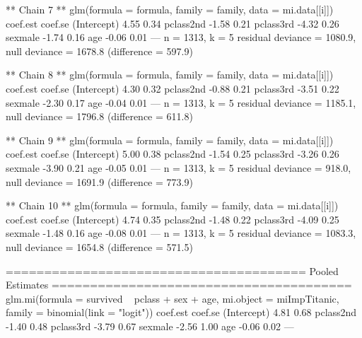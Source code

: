 \begin{Schunk}
\begin{Soutput}
** Chain 7 **
glm(formula = formula, family = family, data = mi.data[[i]])
            coef.est coef.se
(Intercept)  4.55     0.34  
pclass2nd   -1.58     0.21  
pclass3rd   -4.32     0.26  
sexmale     -1.74     0.16  
age         -0.06     0.01  
---
  n = 1313, k = 5
  residual deviance = 1080.9, null deviance = 1678.8 (difference = 597.9)

** Chain 8 **
glm(formula = formula, family = family, data = mi.data[[i]])
            coef.est coef.se
(Intercept)  4.30     0.32  
pclass2nd   -0.88     0.21  
pclass3rd   -3.51     0.22  
sexmale     -2.30     0.17  
age         -0.04     0.01  
---
  n = 1313, k = 5
  residual deviance = 1185.1, null deviance = 1796.8 (difference = 611.8)

** Chain 9 **
glm(formula = formula, family = family, data = mi.data[[i]])
            coef.est coef.se
(Intercept)  5.00     0.38  
pclass2nd   -1.54     0.25  
pclass3rd   -3.26     0.26  
sexmale     -3.90     0.21  
age         -0.05     0.01  
---
  n = 1313, k = 5
  residual deviance = 918.0, null deviance = 1691.9 (difference = 773.9)

** Chain 10 **
glm(formula = formula, family = family, data = mi.data[[i]])
            coef.est coef.se
(Intercept)  4.74     0.35  
pclass2nd   -1.48     0.22  
pclass3rd   -4.09     0.25  
sexmale     -1.48     0.16  
age         -0.08     0.01  
---
  n = 1313, k = 5
  residual deviance = 1083.3, null deviance = 1654.8 (difference = 571.5)

=======================================
Pooled Estimates
=======================================
glm.mi(formula = survived ~ pclass + sex + age, mi.object = miImpTitanic, 
    family = binomial(link = "logit"))
            coef.est coef.se
(Intercept)  4.81     0.68  
pclass2nd   -1.40     0.48  
pclass3rd   -3.79     0.67  
sexmale     -2.56     1.00  
age         -0.06     0.02  
---
\end{Soutput}
\end{Schunk}
